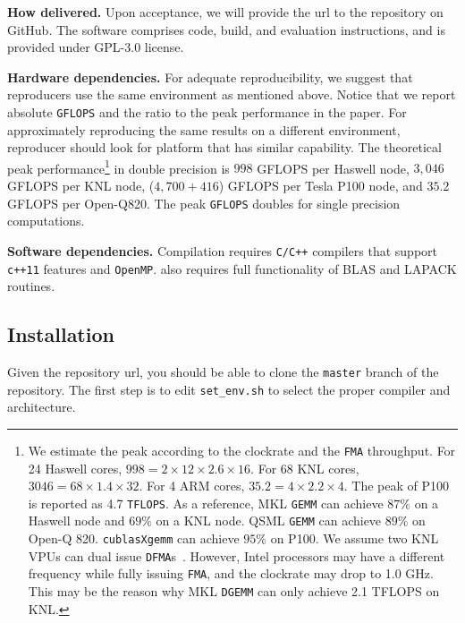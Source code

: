 \textbf{How delivered.}
Upon acceptance, we will provide the url to the \gofmm{} 
repository on GitHub. The software comprises code, build, and evaluation
instructions, and is provided under GPL-3.0 license.


\textbf{Hardware dependencies.}
For adequate reproducibility, we suggest that reproducers use
the same environment as mentioned above. Notice that we report
absolute \texttt{GFLOPS} and the ratio to the peak performance
in the paper. For approximately reproducing the same results
on a different environment, reproducer should look for platform
that has similar capability.
The theoretical peak performance\footnote{\scriptsize{We estimate the peak 
according to the clockrate
and the \texttt{FMA} throughput. For 24 Haswell cores,
$998=2\times12\times2.6\times16$. For 68 KNL cores,
$3046=68\times1.4\times32$. For 4 ARM cores, $35.2=4\times 2.2\times 4$.
The peak of P100 is reported as 4.7 \texttt{TFLOPS}.
As a reference, MKL \texttt{GEMM} can achieve $87\%$ on a Haswell node and 
$69\%$ on a KNL node. QSML \texttt{GEMM} can achieve $89\%$ on Open-Q 820.
\texttt{cublasXgemm} can achieve $95\%$ on P100.
We assume two KNL VPUs can dual issue \texttt{DFMA}s~\cite{sodani2016knights}.
However, Intel processors may have a different frequency while fully issuing 
  \texttt{FMA}, and the clockrate may drop to 1.0 GHz. This may be the reason
why MKL \texttt{DGEMM} can only achieve 2.1 TFLOPS on KNL.}} in double precision is $998$ GFLOPS per Haswell node, $3,046$ GFLOPS
per KNL node, ($4,700+416$) GFLOPS per Tesla P100 node, and $35.2$ GFLOPS 
per Open-Q820.
The peak \texttt{GFLOPS} doubles for single precision computations.

\textbf{Software dependencies.}
Compilation requires \texttt{C/C++} compilers that support \texttt{c++11}
features and \texttt{OpenMP}. \gofmm{} also requires full functionality 
of BLAS and LAPACK routines.

\subsection{Installation} \label{s:sup_install}
Given the repository url, you should be able to clone the \texttt{master}
branch of the repository. The first step is to edit \texttt{set\_env.sh}
to select the proper compiler and architecture.

